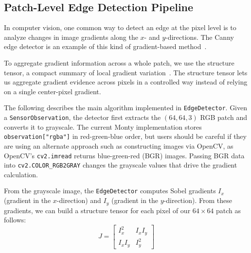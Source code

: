 \documentclass{article}
\begin{document}

\subsection{Patch-Level Edge Detection Pipeline}

In computer vision, one common way to detect an edge at the pixel level is to analyze changes in image gradients along the $x$- and $y$-directions.
The Canny edge detector is an example of this kind of gradient-based method~\cite{opencv_canny}.

To aggregate gradient information across a whole patch, we use the structure tensor, a compact summary of local gradient variation~\cite{khan_corner_detection,opencv_gst}.
The structure tensor lets us aggregate gradient evidence across pixels in a controlled way instead of relying on a single center-pixel gradient.


The following describes the main algorithm implemented in \texttt{EdgeDetector}.
Given a \texttt{SensorObservation}, the detector first extracts the $(64, 64, 3)$ RGB patch and converts it to grayscale.
The current Monty implementation stores \texttt{observation["rgba"]} in red-green-blue order, but users should be careful if they are using an alternate approach such as constructing images via OpenCV, as OpenCV's \texttt{cv2.imread} returns blue-green-red (BGR) images.
Passing BGR data into \texttt{cv2.COLOR\_RGB2GRAY} changes the grayscale values that drive the gradient calculation.

From the grayscale image, the \texttt{EdgeDetector} computes Sobel gradients $I_x$ (gradient in the $x$-direction) and $I_y$ (gradient in the $y$-direction).
From these gradients, we can build a structure tensor for each pixel of our $64 \times 64$ patch as follows:
\[
  J =
  \begin{bmatrix}
    I_x^2 & I_x I_y \\
    I_x I_y & I_y^2
  \end{bmatrix}
\]
\end{document}
